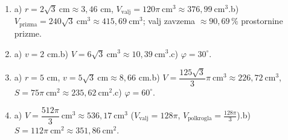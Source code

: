 \documentclass[a4paper,12pt]{letter}
\begin{document}
\begin{enumerate}
\item a) $r=2\sqrt3\ \text{cm}\approx3{,}46$ cm, $V_{\text{valj}}=120\pi\ \text{cm}^3\approx376{,}99\ \text{cm}^3$.\quad b) $V_{\text{prizma}}=240\sqrt3\ \text{cm}^3\approx415{,}69\ \text{cm}^3$; valj zavzema $\approx90{,}69\,\%$ prostornine prizme.
\item a) $v=2$ cm.\quad b) $V=6\sqrt3\ \text{cm}^3\approx10{,}39\ \text{cm}^3$.\quad c) $\varphi=30^{\circ}$.
\item a) $r=5$ cm, $v=5\sqrt3\ \text{cm}\approx8{,}66$ cm.\quad b) $V=\dfrac{125\sqrt3}{3}\pi\ \text{cm}^3\approx226{,}72\ \text{cm}^3$, $S=75\pi\ \text{cm}^2\approx235{,}62\ \text{cm}^2$.\quad c) $\varphi=60^{\circ}$.
\item a) $V=\dfrac{512\pi}{3}\ \text{cm}^3\approx536{,}17\ \text{cm}^3$ ($V_{\text{valj}}=128\pi$, $V_{\text{polkrogla}}=\tfrac{128\pi}{3}$).\quad b) $S=112\pi\ \text{cm}^2\approx351{,}86\ \text{cm}^2$.
\end{enumerate}
\end{document}
